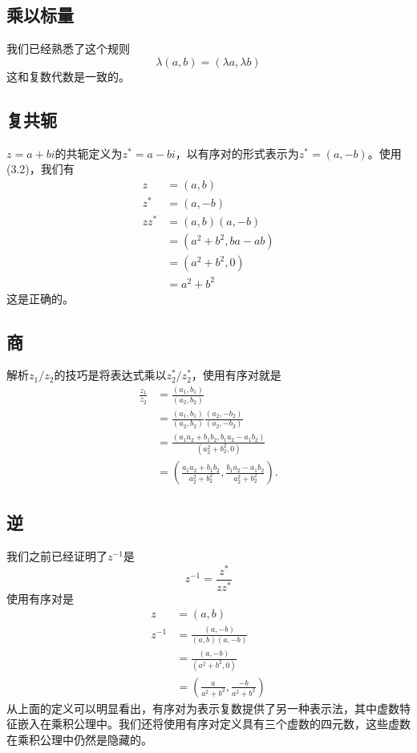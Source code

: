 \subsection{乘以标量}
我们已经熟悉了这个规则
$$
\lambda(a, b)=(\lambda a, \lambda b)
$$
这和复数代数是一致的。

\subsection{复共轭}
$z=a+ bi $的共轭定义为$z^{*}=a- bi $，以有序对的形式表示为$z^{*}=(a,-b)$。使用(3.2)，我们有
$$
\begin{aligned}
z & =(a, b) \\
z^{*} & =(a,-b) \\
z z^{*} & =(a, b)(a,-b) \\
& =\left(a^{2}+b^{2}, b a-a b\right) \\
& =\left(a^{2}+b^{2}, 0\right) \\
& =a^{2}+b^{2}
\end{aligned}
$$
这是正确的。

\subsection{商}
解析$z_{1} / z_{2}$的技巧是将表达式乘以$z_{2}^{*} / z_{2}^{*}$，使用有序对就是
$$
\begin{aligned}
\frac{z_{1}}{z_{2}} & =\frac{\left(a_{1}, b_{1}\right)}{\left(a_{2}, b_{2}\right)} \\
& =\frac{\left(a_{1}, b_{1}\right)}{\left(a_{2}, b_{2}\right)} \frac{\left(a_{2},-b_{2}\right)}{\left(a_{2},-b_{2}\right)} \\
& =\frac{\left(a_{1} a_{2}+b_{1} b_{2}, b_{1} a_{2}-a_{1} b_{2}\right)}{\left(a_{2}^{2}+b_{2}^{2}, 0\right)} \\
& =\left(\frac{a_{1} a_{2}+b_{1} b_{2}}{a_{2}^{2}+b_{2}^{2}}, \frac{b_{1} a_{2}-a_{1} b_{2}}{a_{2}^{2}+b_{2}^{2}}\right) .
\end{aligned}
$$

\subsection{逆}
我们之前已经证明了$z^{-1}$是
$$
z^{-1}=\frac{z^{*}}{z z^{*}}
$$
使用有序对是
$$
\begin{aligned}
z & =(a, b) \\
z^{-1} & =\frac{(a,-b)}{(a, b)(a,-b)}\\
& =\frac{(a,-b)}{\left(a^{2}+b^{2}, 0\right)} \\
& =\left(\frac{a}{a^{2}+b^{2}}, \frac{-b}{a^{2}+b^{2}}\right)
\end{aligned}
$$
从上面的定义可以明显看出，有序对为表示复数提供了另一种表示法，其中虚数特征嵌入在乘积公理中。我们还将使用有序对定义具有三个虚数的四元数，这些虚数在乘积公理中仍然是隐藏的。

